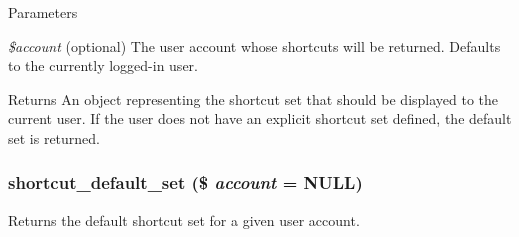 \begin{DoxyParams}{Parameters}
\item[{\em \$account}](optional) The user account whose shortcuts will be returned. Defaults to the currently logged-\/in user.\end{DoxyParams}
\begin{DoxyReturn}{Returns}
An object representing the shortcut set that should be displayed to the current user. If the user does not have an explicit shortcut set defined, the default set is returned. 
\end{DoxyReturn}
\hypertarget{shortcut_8module_aa6912cef5f9525463ac2e317211cc72d}{
\subsubsection[{shortcut\_\-default\_\-set}]{\setlength{\rightskip}{0pt plus 5cm}shortcut\_\-default\_\-set (\$ {\em account} = {\ttfamily NULL})}}
\label{shortcut_8module_aa6912cef5f9525463ac2e317211cc72d}
Returns the default shortcut set for a given user account.


